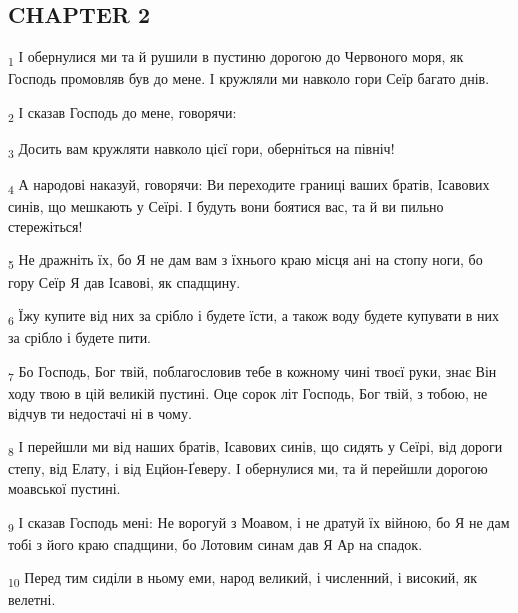 \subsection{CHAPTER 2}
\begin{tcolorbox}
\textsubscript{1} І обернулися ми та й рушили в пустиню дорогою до Червоного моря, як Господь промовляв був до мене. І кружляли ми навколо гори Сеїр багато днів.
\end{tcolorbox}
\begin{tcolorbox}
\textsubscript{2} І сказав Господь до мене, говорячи:
\end{tcolorbox}
\begin{tcolorbox}
\textsubscript{3} Досить вам кружляти навколо цієї гори, оберніться на північ!
\end{tcolorbox}
\begin{tcolorbox}
\textsubscript{4} А народові наказуй, говорячи: Ви переходите границі ваших братів, Ісавових синів, що мешкають у Сеїрі. І будуть вони боятися вас, та й ви пильно стережіться!
\end{tcolorbox}
\begin{tcolorbox}
\textsubscript{5} Не дражніть їх, бо Я не дам вам з їхнього краю місця ані на стопу ноги, бо гору Сеїр Я дав Ісавові, як спадщину.
\end{tcolorbox}
\begin{tcolorbox}
\textsubscript{6} Їжу купите від них за срібло і будете їсти, а також воду будете купувати в них за срібло і будете пити.
\end{tcolorbox}
\begin{tcolorbox}
\textsubscript{7} Бо Господь, Бог твій, поблагословив тебе в кожному чині твоєї руки, знає Він ходу твою в цій великій пустині. Оце сорок літ Господь, Бог твій, з тобою, не відчув ти недостачі ні в чому.
\end{tcolorbox}
\begin{tcolorbox}
\textsubscript{8} І перейшли ми від наших братів, Ісавових синів, що сидять у Сеїрі, від дороги степу, від Елату, і від Ецйон-Ґеверу. І обернулися ми, та й перейшли дорогою моавської пустині.
\end{tcolorbox}
\begin{tcolorbox}
\textsubscript{9} І сказав Господь мені: Не ворогуй з Моавом, і не дратуй їх війною, бо Я не дам тобі з його краю спадщини, бо Лотовим синам дав Я Ар на спадок.
\end{tcolorbox}
\begin{tcolorbox}
\textsubscript{10} Перед тим сиділи в ньому еми, народ великий, і численний, і високий, як велетні.
\end{tcolorbox}
